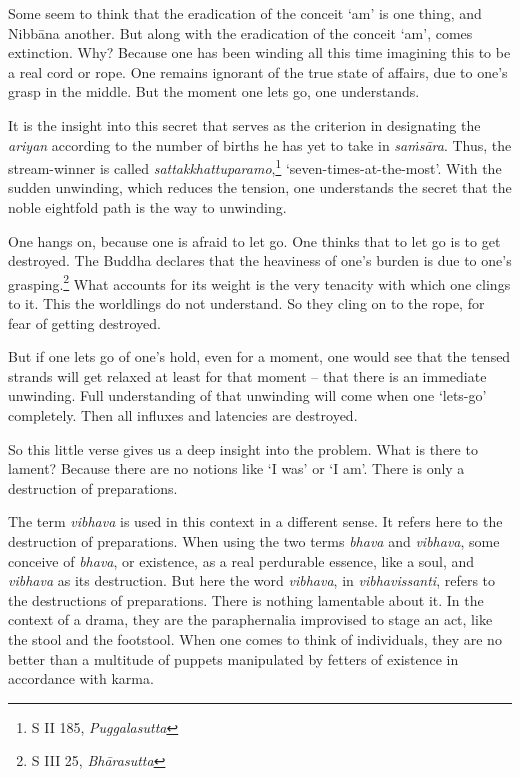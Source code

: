 Some seem to think that the eradication of the conceit `am' is one thing, and Nibbāna another. But along with the eradication of the conceit `am', comes extinction. Why? Because one has been winding all this time imagining this to be a real cord or rope. One remains ignorant of the true state of affairs, due to one's grasp in the middle. But the moment one lets go, one understands.

It is the insight into this secret that serves as the criterion in designating the \emph{ariyan} according to the number of births he has yet to take in \emph{saṁsāra}. Thus, the stream-winner is called \emph{sattakkhattuparamo},\footnote{S II 185, \emph{Puggalasutta}} `seven-times-at-the-most'. With the sudden unwinding, which reduces the tension, one understands the secret that the noble eightfold path is the way to unwinding.

One hangs on, because one is afraid to let go. One thinks that to let go is to get destroyed. The Buddha declares that the heaviness of one's burden is due to one's grasping.\footnote{S III 25, \emph{Bhārasutta}} What accounts for its weight is the very tenacity with which one clings to it. This the worldlings do not understand. So they cling on to the rope, for fear of getting destroyed.

But if one lets go of one's hold, even for a moment, one would see that the tensed strands will get relaxed at least for that moment -- that there is an immediate unwinding. Full understanding of that unwinding will come when one `lets-go' completely. Then all influxes and latencies are destroyed.

So this little verse gives us a deep insight into the problem. What is there to lament? Because there are no notions like `I was' or `I am'. There is only a destruction of preparations.

The term \emph{vibhava} is used in this context in a different sense. It refers here to the destruction of preparations. When using the two terms \emph{bhava} and \emph{vibhava}, some conceive of \emph{bhava}, or existence, as a real perdurable essence, like a soul, and \emph{vibhava} as its destruction. But here the word \emph{vibhava}, in \emph{vibhavissanti}, refers to the destructions of preparations. There is nothing lamentable about it. In the context of a drama, they are the paraphernalia improvised to stage an act, like the stool and the footstool. When one comes to think of individuals, they are no better than a multitude of puppets manipulated by fetters of existence in accordance with karma.

